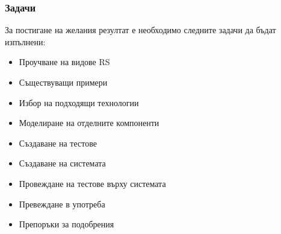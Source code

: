 	\subsubsection{Задачи}
		
		За постигане на желания резултат е необходимо следните задачи да бъдат изпълнени:	
	
		\begin{itemize}
			\item Проучване на видове \ac{RS}
			\item Съществуващи примери
			\item Избор на подходящи технологии
			\item Моделиране на отделните компоненти
			\item Създаване на тестове
			\item Създаване на системата
			\item Провеждане на тестове върху системата
			\item Превеждане в употреба
			\item Препоръки за подобрения
		\end{itemize}